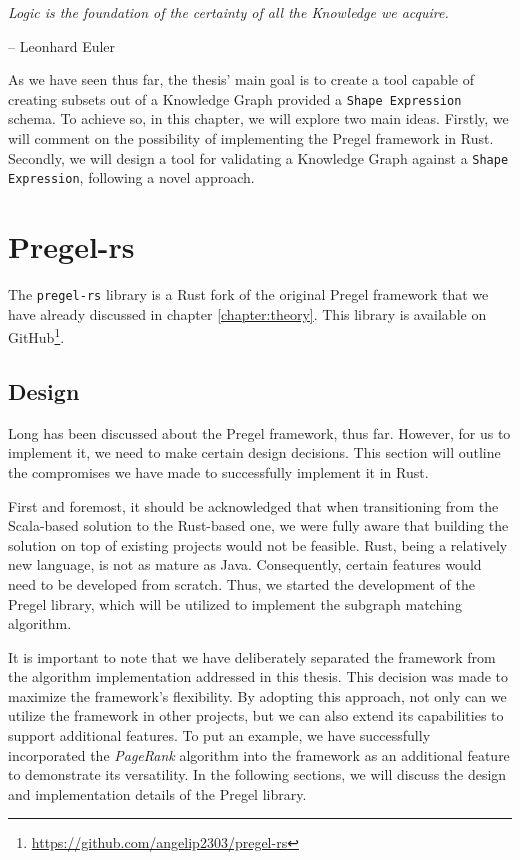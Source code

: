 \epigraph{\textit{Logic is the foundation of the certainty of all the Knowledge we acquire.}}{-- \textup{Leonhard Euler}}

As we have seen thus far, the thesis' main goal is to create a tool capable of creating subsets out of a Knowledge Graph provided a \texttt{Shape Expression} schema. To achieve so, in this chapter, we will explore two main ideas. Firstly, we will comment on the possibility of implementing the Pregel framework in Rust. Secondly, we will design a tool for validating a Knowledge Graph against a \texttt{Shape Expression}, following a novel approach.

\section{Pregel-rs}

The \texttt{pregel-rs} library is a Rust fork of the original Pregel framework that we have already discussed in chapter \ref{chapter:theory}. This library is available on GitHub\footnote{\url{https://github.com/angelip2303/pregel-rs}}.

\subsection{Design}

Long has been discussed about the Pregel framework, thus far. However, for us to implement it, we need to make certain design decisions. This section will outline the compromises we have made to successfully implement it in Rust.

First and foremost, it should be acknowledged that when transitioning from the Scala-based solution to the Rust-based one, we were fully aware that building the solution on top of existing projects would not be feasible. Rust, being a relatively new language, is not as mature as Java. Consequently, certain features would need to be developed from scratch. Thus, we started the development of the Pregel library, which will be utilized to implement the subgraph matching algorithm.

It is important to note that we have deliberately separated the framework from the algorithm implementation addressed in this thesis. This decision was made to maximize the framework's flexibility. By adopting this approach, not only can we utilize the framework in other projects, but we can also extend its capabilities to support additional features. To put an example, we have successfully incorporated the \textit{PageRank} algorithm into the framework as an additional feature to demonstrate its versatility. In the following sections, we will discuss the design and implementation details of the Pregel library.


